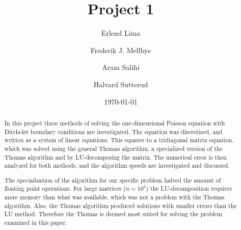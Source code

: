 \documentclass[aps,prl,reprint,toc]{revtex4-1}
\newcommand\blankpage{%
  \null
  \thispagestyle{empty}%
  \addtocounter{page}{-1}%
  \newpage}
\begin{document}
\title{Project 1}
\author{Erlend Lima}
\author{Frederik J. Mellbye}
\author{Aram Salihi}
\author{Halvard Sutterud}
\date{\today}

\begin{abstract}
      In this project three methods of solving the one-dimensional Poisson equation with
      Dirchelet boundary conditions are investigated. The equation was discretized,
      and written as a system of linear equations. This equates to
      a tridiagonal matrix equation, which was solved using the general Thomas algorithm,
      a specialized version of the Thomas algorithm and by LU-decomposing the matrix. The
      numerical error is then analyzed for both methods, and the algorithm speeds are investigated and discussed.

      The specialization of the algorithm for our specific problem halved the
      amount of floating point operations. For large
      matrices ($n \sim 10^5$) the LU-decomposition requires
      more memory than what was available, which was not a problem with the Thomas
      algorithm. Also, the Thomas algorithm produced solutions with smaller errors
      than the LU method. Therefore the Thomas is deemed most suited for solving the problem
      examined in this paper.
\end{abstract}
\maketitle
\tableofcontents
\newpage

%
%
\blankpage
\blankpage
\end{document}
